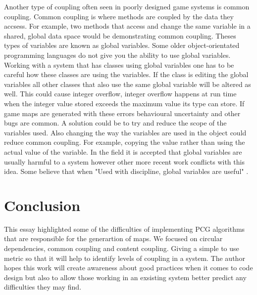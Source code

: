 \documentclass{scrartcl}
\begin{document}
Another type of coupling often seen in poorly designed game systems is common coupling. Common coupling is where methods are coupled by the data they accsess\cite{briand1999unified}. For example, two methods that access and change the same variable in a shared, global data space would be demonstrating common coupling. Theses types of variables are known as global variables. Some older object-orientated programming languages do not give you the ability to use global variables. Working with a system that has classes using global variables one has to be careful how these classes are using the variables. If the class is editing the global variables all other classes that also use the same global variable will be altered as well. This could cause integer overflow, integer overflow happens at run time when the integer value stored exceeds the maximum value its type can store\cite{muntean2015smt}. If game maps are generated with these errors behavioural uncertainty and other bugs are common. A solution could be to try and reduce the scope of the variables used. Also changing the way the variables are used in the object could reduce common coupling. For example, copying the value rather than using the actual value of the variable. In the field it is accepted that global variables are usually harmful to a system\cite {wulf1973global} however other more recent work conflicts with this idea. Some believe that when "Used with discipline, global variables are useful"\cite [p.338]{mcconnell2004code} .

\section{Conclusion}
This essay highlighted some of the difficulties of implementing PCG algorithms that are responsible for the generartion of maps. We focused on circular dependencies, common coupling and content coupling. Giving a simple to use metric so that it will help to identify levels of coupling in a system. The author hopes this work will create awareness about good practices when it comes to code design but also to allow those working in an exsisting system better predict any difficulties they may find.  



\end{document}
